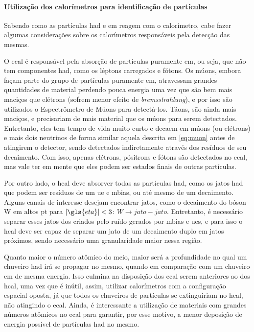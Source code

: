\paragraph{Utilização dos calorímetros para identificação de partículas}
\label{par:cal_part_id}


Sabendo como as partículas \gls{had} e \gls{em} reagem com
o calorímetro, cabe fazer algumas considerações sobre os calorímetros
responsáveis pela detecção das mesmas. 

O \gls{ecal} é responsável pela absorção
de partículas puramente \gls{em}, ou seja, que não tem componentes
\gls{had}, como os léptons carregados e fótons. Os múons, embora façam parte do
grupo de partículas puramente \gls{em}, atravessam
grandes quantidades de material perdendo pouca energia uma vez que são bem mais
maciços que elétrons (sofrem menor efeito de \emph{bremsstrahlung}),
e por isso são utilizados o Espectrômetro de Múons para
detectá-los. Táons, são ainda mais maciços, e precisariam de mais
material que os múons para serem detectados. Entretanto, eles tem tempo de vida muito curto e
decaem em múons (ou elétrons) e mais dois neutrinos de forma similar aquela
descrita em \ref{eq:muon} antes de atingirem o detector, sendo detectados
indiretamente através dos resíduos de seu decaimento. Com isso, apenas elétrons,
pósitrons e fótons são detectados no \gls{ecal}, mas vale ter em mente que eles
podem ser estados finais de outras partículas. 

Por outro lado, o \gls{hcal} deve absorver todas as partículas \gls{had}, como os jatos
\gls{had} que podem ser resíduos de um \gls{ue} e \gls{mbias}, ou até mesmo de
um decaimento. Alguns canais de interesse desejam encontrar jatos, como 
o decaimento do bóson W em altos \gls{pt} para $|\gls{eta}|<3$: $W\rightarrow jato-jato$. 
Entretanto, é necessário separar esses jatos dos criados pelo ruído 
gerados por \gls{mbias} e \glspl{ue}, e para isso o \gls{hcal} deve ser capaz de
separar um jato de um decaimento duplo em jatos próximos, sendo
necessário uma granularidade maior nessa região.

Quanto maior o número atômico do meio, maior será a profundidade no qual um
chuveiro \gls{had} irá se propagar no mesmo, quando em comparação com um chuveiro
\gls{em} de mesma energia. Isso culmina na disposição
dos \gls{ecal} serem anteriores ao dos \gls{hcal}, uma vez que é inútil, assim, utilizar calorímetros com a 
configuração espacial oposta, já que todos os chuveiros de partículas se
extinguiriam no \gls{hcal}, não atingindo o \gls{ecal}. Ainda, é interessante a
utilização de materiais com grandes números atômicos no \gls{ecal} para
garantir, por esse motivo, a menor deposição de energia possível de partículas
\gls{had} no mesmo.

